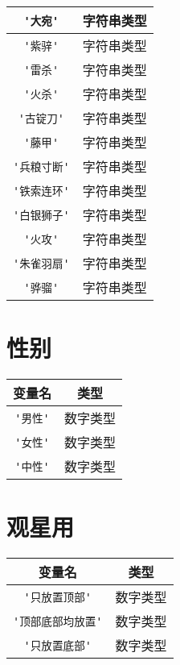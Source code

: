 \begin{center}
\begin{longtable}{|c|c|}
\hline \verb|'大宛'| & 字符串类型 \\
\hline \verb|'紫骍'| & 字符串类型 \\
\hline \verb|'雷杀'| & 字符串类型 \\
\hline \verb|'火杀'| & 字符串类型 \\
\hline \verb|'古锭刀'| & 字符串类型 \\
\hline \verb|'藤甲'| & 字符串类型 \\
\hline \verb|'兵粮寸断'| & 字符串类型 \\
\hline \verb|'铁索连环'| & 字符串类型 \\
\hline \verb|'白银狮子'| & 字符串类型 \\
\hline \verb|'火攻'| & 字符串类型 \\
\hline \verb|'朱雀羽扇'| & 字符串类型 \\
\hline \verb|'骅骝'| & 字符串类型 \\
\hline
\end{longtable}
\end{center}

\section{性别}

\begin{center}
\begin{longtable}{|c|c|}
\hline \textbf{变量名} & \textbf{类型} \\
\hline \verb|'男性'| & 数字类型 \\
\hline \verb|'女性'| & 数字类型 \\
\hline \verb|'中性'| & 数字类型 \\
\hline
\end{longtable}
\end{center}

\section{观星用}

\begin{center}
\begin{longtable}{|c|c|}
\hline \textbf{变量名} & \textbf{类型} \\
\hline \verb|'只放置顶部'| & 数字类型 \\
\hline \verb|'顶部底部均放置'| & 数字类型 \\
\hline \verb|'只放置底部'| & 数字类型 \\
\hline
\end{longtable}
\end{center}

